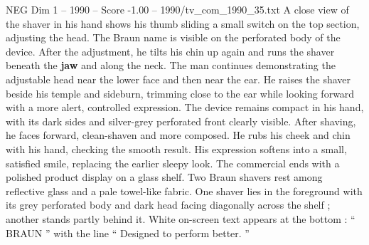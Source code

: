 \begin{textsample}{NEG Dim 1 – 1990 – Score -1.00 – 1990/tv\_com\_1990\_35.txt}
A close view of the shaver in his hand shows his thumb sliding a small switch on the top section, adjusting the head.
The Braun name is visible on the perforated body of the device.
After the adjustment, he tilts his chin up again and runs the shaver beneath the \textbf{jaw} and along the neck.
The man continues demonstrating the adjustable head near the lower face and then near the ear.
He raises the shaver beside his temple and sideburn, trimming close to the ear while looking forward with a more alert, controlled expression.
The device remains compact in his hand, with its dark sides and silver-grey perforated front clearly visible.
After shaving, he faces forward, clean-shaven and more composed.
He rubs his cheek and chin with his hand, checking the smooth result.
His expression softens into a small, satisfied smile, replacing the earlier sleepy look.
The commercial ends with a polished product display on a glass shelf.
Two Braun shavers rest among reflective glass and a pale towel-like fabric.
One shaver lies in the foreground with its grey perforated body and dark head facing diagonally across the shelf ; another stands partly behind it.
White on-screen text appears at the bottom : “ BRAUN ” with the line “ Designed to perform better. ”

\end{textsample}
